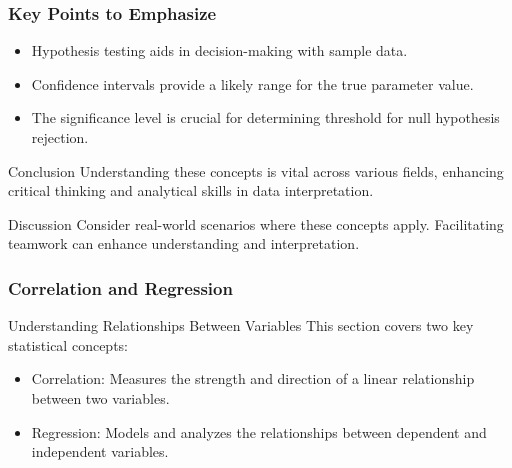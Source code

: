\documentclass[aspectratio=169]{beamer}
\begin{document}
\begin{frame}[fragile]
    \frametitle{Key Points to Emphasize}
    \begin{itemize}
        \item Hypothesis testing aids in decision-making with sample data.
        \item Confidence intervals provide a likely range for the true parameter value.
        \item The significance level is crucial for determining threshold for null hypothesis rejection.
    \end{itemize}

    \begin{block}{Conclusion}
        Understanding these concepts is vital across various fields, enhancing critical thinking and analytical skills in data interpretation.
    \end{block}

    \begin{block}{Discussion}
        Consider real-world scenarios where these concepts apply. Facilitating teamwork can enhance understanding and interpretation.
    \end{block}
\end{frame}

\begin{frame}[fragile]
    \frametitle{Correlation and Regression}
    \begin{block}{Understanding Relationships Between Variables}
        This section covers two key statistical concepts:
        \begin{itemize}
            \item Correlation: Measures the strength and direction of a linear relationship between two variables.
            \item Regression: Models and analyzes the relationships between dependent and independent variables.
        \end{itemize}
    \end{block}
\end{frame}
\end{document}
